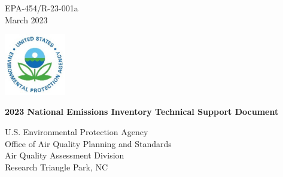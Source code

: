 \thispagestyle{empty}

\begin{flushright}
EPA-454/R-23-001a \\
March 2023
\end{flushright}

\includegraphics[width=0.20\textwidth]{figures/epa-logo.jpg}

\begin{center}
\textbf{\Large{2023 National Emissions Inventory Technical Support Document}}
\end{center}

\vspace{0.60\textheight}

\begin{center}
U.S. Environmental Protection Agency \\
Office of Air Quality Planning and Standards \\
Air Quality Assessment Division \\
Research Triangle Park, NC
\end{center}

